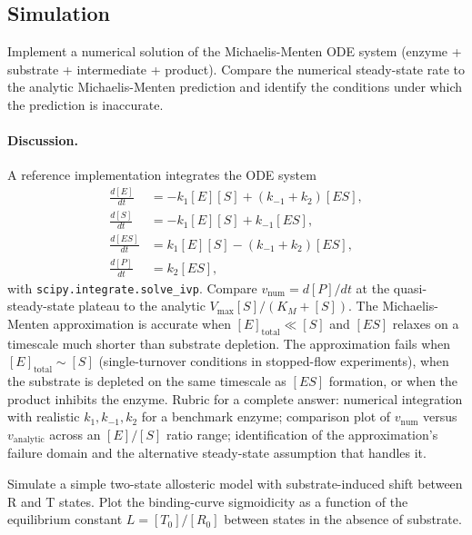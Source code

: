 \subsection*{Simulation}

\begin{exercise}
Implement a numerical solution of the Michaelis-Menten ODE system
(enzyme + substrate + intermediate + product). Compare the numerical
steady-state rate to the analytic Michaelis-Menten prediction and
identify the conditions under which the prediction is inaccurate.
\end{exercise}

\paragraph{Discussion.}
A reference implementation integrates the ODE system
\begin{align*}
\frac{d[E]}{dt} &= -k_1 [E][S] + (k_{-1} + k_2)[ES], \\
\frac{d[S]}{dt} &= -k_1 [E][S] + k_{-1}[ES], \\
\frac{d[ES]}{dt} &= k_1 [E][S] - (k_{-1} + k_2)[ES], \\
\frac{d[P]}{dt} &= k_2 [ES],
\end{align*}
with \texttt{scipy.integrate.solve\_ivp}. Compare $v_{\text{num}} =
d[P]/dt$ at the quasi-steady-state plateau to the analytic
$V_{\max}[S]/(K_M + [S])$. The Michaelis-Menten approximation is
accurate when $[E]_{\text{total}} \ll [S]$ and $[ES]$ relaxes on a
timescale much shorter than substrate depletion. The approximation
fails when $[E]_{\text{total}} \sim [S]$ (single-turnover conditions
in stopped-flow experiments), when the substrate is depleted on the
same timescale as $[ES]$ formation, or when the product inhibits the
enzyme. Rubric for a complete answer: numerical integration with
realistic $k_1, k_{-1}, k_2$ for a benchmark enzyme; comparison plot
of $v_{\text{num}}$ versus $v_{\text{analytic}}$ across an
$[E]/[S]$ ratio range; identification of the approximation's failure
domain and the alternative steady-state assumption that handles it.

\begin{exercise}
Simulate a simple two-state allosteric model with substrate-induced
shift between R and T states. Plot the binding-curve sigmoidicity
as a function of the equilibrium constant $L = [T_0]/[R_0]$ between
states in the absence of substrate.
\end{exercise}

